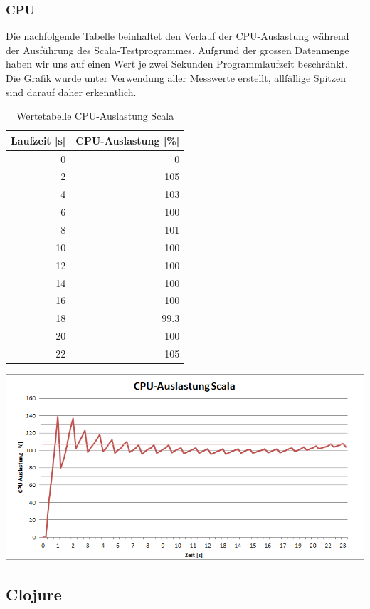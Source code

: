 \documentclass{fancydocument}
\begin{document}
\subsubsection{CPU}
Die nachfolgende Tabelle beinhaltet den Verlauf der CPU-Auslastung während der Ausführung des Scala-Testprogrammes. Aufgrund der grossen Datenmenge haben wir uns auf einen Wert je zwei Sekunden Programmlaufzeit beschränkt. Die Grafik wurde unter Verwendung aller Messwerte erstellt, allfällige Spitzen sind darauf daher erkenntlich.
\begin{table}[h!]
\centering
\begin{tabular}{|r|r|} \hline
\textbf{Laufzeit [s]} & \textbf{CPU-Auslastung [\%]}\\
\hline
0 & 0\\
\hline
2 & 105\\
\hline
4 & 103\\
\hline
6 & 100\\
\hline
8 & 101\\
\hline
10 & 100\\
\hline
12 & 100\\
\hline
14 & 100\\
\hline
16 & 100\\
\hline
18 & 99.3\\
\hline
20 & 100\\
\hline
22 & 105\\
\hline
\end{tabular}
\caption{Wertetabelle CPU-Auslastung Scala}
\end{table}
\begin{center}
\includegraphics[width=\linewidth]{bilder/CPUScala.png}
\end{center}

\subsection{Clojure}
\end{document}
